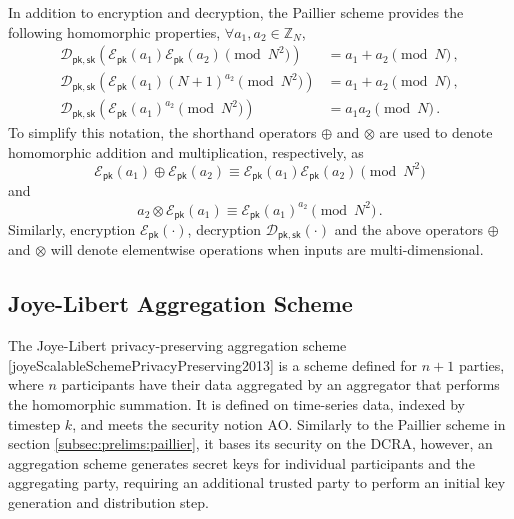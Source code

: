 In addition to encryption and decryption, the Paillier scheme provides the following homomorphic properties, $\forall a_1,a_2 \in \mathbb{Z}_N$,
\begin{align}
    \mathcal{D}_{\mathsf{pk},\mathsf{sk}}\left(\mathcal{E}_{\mathsf{pk}}(a_1)\mathcal{E}_{\mathsf{pk}}(a_2) \pmod{N^2}\right) &= a_1+a_2 \pmod{N}\,, \label{eq:prelims:paillier_hom_add}\\
    \mathcal{D}_{\mathsf{pk},\mathsf{sk}}\left(\mathcal{E}_{\mathsf{pk}}(a_1)(N+1)^{a_2} \pmod{N^2}\right) &= a_1+a_2 \pmod{N}\,, \label{eq:prelims:paillier_hom_add_plain}\\
    \mathcal{D}_{\mathsf{pk},\mathsf{sk}}\left(\mathcal{E}_{\mathsf{pk}}(a_1)^{a_2} \pmod{N^2}\right) &= a_1a_2 \pmod{N}\,. \label{eq:prelims:paillier_hom_mult}
\end{align}
To simplify this notation, the shorthand operators $\oplus$ and $\otimes$ are used to denote homomorphic addition and multiplication, respectively, as
\begin{equation}\label{eq:prelims:paillier_hom_add_op}
    \mathcal{E}_{\mathsf{pk}}(a_1)\oplus\mathcal{E}_{\mathsf{pk}}(a_2) \equiv \mathcal{E}_{\mathsf{pk}}(a_1)\mathcal{E}_{\mathsf{pk}}(a_2) \pmod{N^2}
\end{equation}
and
\begin{equation}\label{eq:prelims:paillier_hom_mult_op}
    a_2\otimes\mathcal{E}_{\mathsf{pk}}(a_1) \equiv \mathcal{E}_{\mathsf{pk}}(a_1)^{a_2} \pmod{N^2}\,.
\end{equation}
Similarly, encryption $\mathcal{E}_{\mathsf{pk}}(\cdot)$, decryption $\mathcal{D}_{\mathsf{pk},\mathsf{sk}}(\cdot)$ and the above operators $\oplus$ and $\otimes$ will denote elementwise operations when inputs are multi-dimensional.

% 
% 

\subsection{Joye-Libert Aggregation Scheme}\label{subsec:prelims:joye_libert_agg}
The Joye-Libert privacy-preserving aggregation scheme [joyeScalableSchemePrivacyPreserving2013] is a scheme defined for $n+1$ parties, where $n$ participants have their data aggregated by an aggregator that performs the homomorphic summation. It is defined on time-series data, indexed by timestep $k$, and meets the security notion AO. Similarly to the Paillier scheme in section \ref{subsec:prelims:paillier}, it bases its security on the DCRA, however, an aggregation scheme generates secret keys for individual participants and the aggregating party, requiring an additional trusted party to perform an initial key generation and distribution step.

